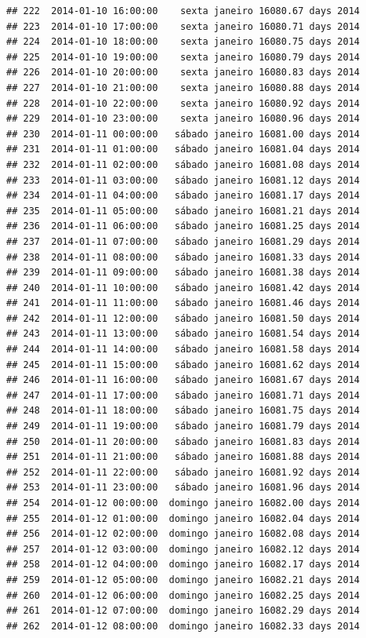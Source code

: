 \documentclass[]{book}
\begin{document}
\begin{verbatim}
## 222  2014-01-10 16:00:00    sexta janeiro 16080.67 days 2014
## 223  2014-01-10 17:00:00    sexta janeiro 16080.71 days 2014
## 224  2014-01-10 18:00:00    sexta janeiro 16080.75 days 2014
## 225  2014-01-10 19:00:00    sexta janeiro 16080.79 days 2014
## 226  2014-01-10 20:00:00    sexta janeiro 16080.83 days 2014
## 227  2014-01-10 21:00:00    sexta janeiro 16080.88 days 2014
## 228  2014-01-10 22:00:00    sexta janeiro 16080.92 days 2014
## 229  2014-01-10 23:00:00    sexta janeiro 16080.96 days 2014
## 230  2014-01-11 00:00:00   sábado janeiro 16081.00 days 2014
## 231  2014-01-11 01:00:00   sábado janeiro 16081.04 days 2014
## 232  2014-01-11 02:00:00   sábado janeiro 16081.08 days 2014
## 233  2014-01-11 03:00:00   sábado janeiro 16081.12 days 2014
## 234  2014-01-11 04:00:00   sábado janeiro 16081.17 days 2014
## 235  2014-01-11 05:00:00   sábado janeiro 16081.21 days 2014
## 236  2014-01-11 06:00:00   sábado janeiro 16081.25 days 2014
## 237  2014-01-11 07:00:00   sábado janeiro 16081.29 days 2014
## 238  2014-01-11 08:00:00   sábado janeiro 16081.33 days 2014
## 239  2014-01-11 09:00:00   sábado janeiro 16081.38 days 2014
## 240  2014-01-11 10:00:00   sábado janeiro 16081.42 days 2014
## 241  2014-01-11 11:00:00   sábado janeiro 16081.46 days 2014
## 242  2014-01-11 12:00:00   sábado janeiro 16081.50 days 2014
## 243  2014-01-11 13:00:00   sábado janeiro 16081.54 days 2014
## 244  2014-01-11 14:00:00   sábado janeiro 16081.58 days 2014
## 245  2014-01-11 15:00:00   sábado janeiro 16081.62 days 2014
## 246  2014-01-11 16:00:00   sábado janeiro 16081.67 days 2014
## 247  2014-01-11 17:00:00   sábado janeiro 16081.71 days 2014
## 248  2014-01-11 18:00:00   sábado janeiro 16081.75 days 2014
## 249  2014-01-11 19:00:00   sábado janeiro 16081.79 days 2014
## 250  2014-01-11 20:00:00   sábado janeiro 16081.83 days 2014
## 251  2014-01-11 21:00:00   sábado janeiro 16081.88 days 2014
## 252  2014-01-11 22:00:00   sábado janeiro 16081.92 days 2014
## 253  2014-01-11 23:00:00   sábado janeiro 16081.96 days 2014
## 254  2014-01-12 00:00:00  domingo janeiro 16082.00 days 2014
## 255  2014-01-12 01:00:00  domingo janeiro 16082.04 days 2014
## 256  2014-01-12 02:00:00  domingo janeiro 16082.08 days 2014
## 257  2014-01-12 03:00:00  domingo janeiro 16082.12 days 2014
## 258  2014-01-12 04:00:00  domingo janeiro 16082.17 days 2014
## 259  2014-01-12 05:00:00  domingo janeiro 16082.21 days 2014
## 260  2014-01-12 06:00:00  domingo janeiro 16082.25 days 2014
## 261  2014-01-12 07:00:00  domingo janeiro 16082.29 days 2014
## 262  2014-01-12 08:00:00  domingo janeiro 16082.33 days 2014

\end{verbatim}
\end{document}
